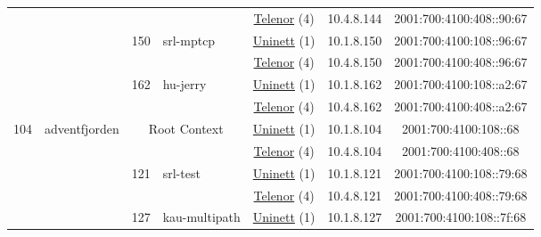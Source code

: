 \begin{small}
\begin{center}
\begin{longtable}{|c|c|c|c|c|c|c|c|}
  &  &  &  & \multicolumn{2}{|c|}{\tiny{\href{https://www.telenor.no}{Telenor} (4)}} & \tiny{10.4.8.144} & \tiny{2001:700:4100:408::90:67} \\* \cline{3-3}\cline{4-4}\cline{5-5}\cline{6-6}\cline{7-7}\cline{8-8}
  &  & \multirow{2}{*}{\tiny{150}} & \multicolumn{1}{|l|}{\multirow{2}{*}{\tiny{srl-mptcp}}} & \multicolumn{2}{|c|}{\tiny{\href{https://www.uninett.no}{Uninett} (1)}} & \tiny{10.1.8.150} & \tiny{2001:700:4100:108::96:67} \\* \cline{5-5}\cline{6-6}\cline{7-7}\cline{8-8}
  &  &  &  & \multicolumn{2}{|c|}{\tiny{\href{https://www.telenor.no}{Telenor} (4)}} & \tiny{10.4.8.150} & \tiny{2001:700:4100:408::96:67} \\* \cline{3-3}\cline{4-4}\cline{5-5}\cline{6-6}\cline{7-7}\cline{8-8}
  &  & \multirow{2}{*}{\tiny{162}} & \multicolumn{1}{|l|}{\multirow{2}{*}{\tiny{hu-jerry}}} & \multicolumn{2}{|c|}{\tiny{\href{https://www.uninett.no}{Uninett} (1)}} & \tiny{10.1.8.162} & \tiny{2001:700:4100:108::a2:67} \\* \cline{5-5}\cline{6-6}\cline{7-7}\cline{8-8}
  &  &  &  & \multicolumn{2}{|c|}{\tiny{\href{https://www.telenor.no}{Telenor} (4)}} & \tiny{10.4.8.162} & \tiny{2001:700:4100:408::a2:67} \\ \hline
 \multirow{20}{*}{\tiny{104}} & \multicolumn{1}{|l|}{\multirow{20}{*}{\tiny{adventfjorden}}} & \multicolumn{2}{|c|}{\multirow{2}{*}{\tiny{Root Context}}} & \multicolumn{2}{|c|}{\tiny{\href{https://www.uninett.no}{Uninett} (1)}} & \tiny{10.1.8.104} & \tiny{2001:700:4100:108::68} \\* \cline{5-5}\cline{6-6}\cline{7-7}\cline{8-8}
  &  & \multicolumn{2}{|c|}{} & \multicolumn{2}{|c|}{\tiny{\href{https://www.telenor.no}{Telenor} (4)}} & \tiny{10.4.8.104} & \tiny{2001:700:4100:408::68} \\* \cline{3-3}\cline{4-4}\cline{5-5}\cline{6-6}\cline{7-7}\cline{8-8}
  &  & \multirow{2}{*}{\tiny{121}} & \multicolumn{1}{|l|}{\multirow{2}{*}{\tiny{srl-test}}} & \multicolumn{2}{|c|}{\tiny{\href{https://www.uninett.no}{Uninett} (1)}} & \tiny{10.1.8.121} & \tiny{2001:700:4100:108::79:68} \\* \cline{5-5}\cline{6-6}\cline{7-7}\cline{8-8}
  &  &  &  & \multicolumn{2}{|c|}{\tiny{\href{https://www.telenor.no}{Telenor} (4)}} & \tiny{10.4.8.121} & \tiny{2001:700:4100:408::79:68} \\* \cline{3-3}\cline{4-4}\cline{5-5}\cline{6-6}\cline{7-7}\cline{8-8}
  &  & \multirow{2}{*}{\tiny{127}} & \multicolumn{1}{|l|}{\multirow{2}{*}{\tiny{kau-multipath}}} & \multicolumn{2}{|c|}{\tiny{\href{https://www.uninett.no}{Uninett} (1)}} & \tiny{10.1.8.127} & \tiny{2001:700:4100:108::7f:68} \\* \cline{5-5}\cline{6-6}\cline{7-7}\cline{8-8}

\end{longtable}
\end{center}
\end{small}
